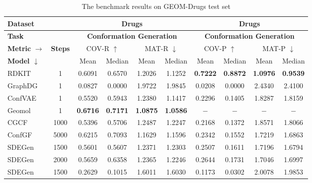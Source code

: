 \documentclass{article} %
\begin{document}
\begin{table}[htbp]
	\centering
	\scriptsize
	\caption{The benchmark results on GEOM-Drugs test set}
	\begin{threeparttable}
		\begin{tabular}{l|c|cccc|cccc}
			\toprule
			\textbf{Dataset} &   &      \multicolumn{4}{c|}{\textbf{Drugs}} & \multicolumn{4}{c}{\textbf{Drugs}} \\
			\midrule
			\textbf{Task} &    &     \multicolumn{4}{c|}{\textbf{Conformation Generation}} & \multicolumn{4}{c}{\textbf{Conformation Generation}} \\
			\midrule
			\multicolumn{1}{l|}{\textbf{Metric} $\rightarrow$} & \multirow{2}[2]{*}{\textbf{Steps}} &       \multicolumn{2}{c}{COV-R $\uparrow$} & \multicolumn{2}{c|}{MAT-R $\downarrow$} & \multicolumn{2}{c}{COV-P $\uparrow$} & \multicolumn{2}{c}{MAT-P $\downarrow$} \\
			\multicolumn{1}{l|}{\textbf{Model $\downarrow$}} &  &   Mean  & Median & Mean  & Median & Mean  & Median & Mean  & Median \\
			\midrule
			RDKIT & 1     &        0.6091  & 0.6570  & 1.2026  & 1.1252  & \textbf{0.7222 } & \textbf{0.8872 } & \textbf{1.0976 } & \textbf{0.9539 } \\
			GraphDG & 1     &        0.0827  & 0.0000  & 1.9722  & 1.9845  & 0.0208  & 0.0000  & 2.4340  & 2.4100  \\
			ConfVAE & 1     &        0.5520  & 0.5943  & 1.2380  & 1.1417  & 0.2296  & 0.1405  & 1.8287  & 1.8159  \\
			Geomol & 1     &        \textbf{0.6716 } & \textbf{0.7171 } & \textbf{1.0875 } & \textbf{1.0586 } & $-$      & $-$      & $-$     & $-$  \\
			\midrule
			CGCF  & 1000  &       0.5396  & 0.5706  & 1.2487  & 1.2247  & 0.2168  & 0.1372  & 1.8571  & 1.8066  \\
			ConfGF & 5000 &       0.6215  & 0.7093  & 1.1629  & 1.1596  & 0.2342  & 0.1552  & 1.7219  & 1.6863  \\
			SDEGen\tnote{$a$}  & 1500 &        0.5601  & 0.5607  & 1.2371  & 1.2303  & 0.2507  & 0.1611  & 1.7196  & 1.6794  \\
			SDEGen\tnote{$b$}  & 2000 &        0.5659  & 0.6358  & 1.2365  & 1.2246  & 0.2644  & 0.1731  & 1.7046  & 1.6997  \\
			SDEGen\tnote{$c$}  & 1500 &        0.2629  & 0.1015  & 1.6011  & 1.6030  & 0.1173  & 0.0302  & 2.0078  & 1.9853  \\

\end{tabular}
\end{threeparttable}
\end{table}
\end{document}
